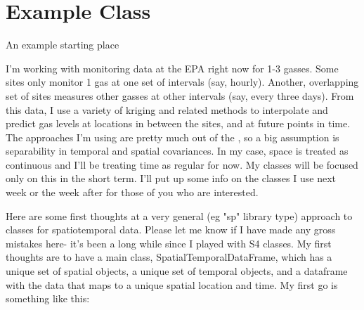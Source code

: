 \documentclass[12pt]{article}
\begin{document}
\section*{Example Class}

An example starting place

I'm working with monitoring data at the EPA right now for 1-3
gasses.  Some sites only monitor 1 gas at one set of intervals (say,
hourly).  Another, overlapping set of sites measures other gasses at
other intervals (say, every three days).  From this data, I use a
variety of kriging and related methods to interpolate and predict gas
levels at locations in between the sites, and at future points in
time.  The approaches I'm using are pretty much out of the
\citet{banerjee2004hma}, so a
big assumption is separability in temporal and spatial covariances.
In my case, space is treated as continuous and I'll be treating time
as regular for now.  My classes will be focused only on this in the
short term. I'll put up some info on the classes I use next week or
the week after for those of you who are interested. 



Here are some first thoughts at a very general (eg "sp" library
    type) approach to classes for spatiotemporal data.  Please let me
    know if I have made any gross mistakes here- it's been a long
    while since I played with S4 classes.  My first thoughts are to
    have a main class, SpatialTemporalDataFrame, which has a unique
    set of spatial objects, a unique set of temporal objects, and a
    dataframe with the data that maps to a unique spatial location and
    time.  My first go is something like this:
\end{document}
